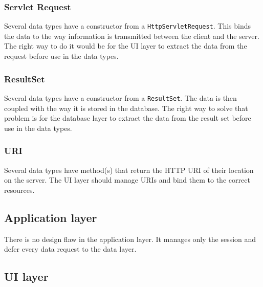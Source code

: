 \subsubsection{Servlet Request}
Several data types have a constructor from a \texttt{HttpServletRequest}. This binds the data to the way information is transmitted between the client and the server. The right way to do it would be for the UI layer to extract the data from the request before use in the data types.

\subsubsection{ResultSet}
Several data types have a constructor from a \texttt{ResultSet}. The data is then coupled with the way it is stored in the database. The right way to solve that problem is for the database layer to extract the data from the result set before use in the data types.

\subsubsection{URI}
Several data types have method(s) that return the HTTP URI of their location on the server. The UI layer should manage URIs and bind them to the correct resources.





\subsection{Application layer}

There is no design flaw in the application layer. It manages only the session and defer every data request to the data layer.

\subsection{UI layer}

